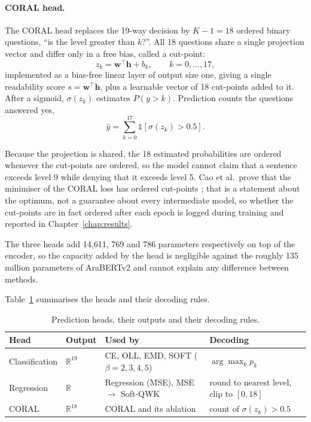 \paragraph{CORAL head.} The CORAL head \cite{cao2020coral} replaces the 19-way decision by
$K-1=18$ ordered binary questions, ``is the level greater than $k$?''. All 18 questions share a
single projection vector and differ only in a free bias, called a cut-point:
\begin{equation}
z_k = \mathbf{w}^{\top}\mathbf{h} + b_k, \qquad k = 0,\dots,17 ,
\label{eq:coral-logits}
\end{equation}
implemented as a bias-free linear layer of output size one, giving a single readability score
$s = \mathbf{w}^{\top}\mathbf{h}$, plus a learnable vector of 18 cut-points added to it. After
a sigmoid, $\sigma(z_k)$ estimates $P(y>k)$. Prediction counts the questions answered yes,
\begin{equation}
\hat{y} = \sum_{k=0}^{17} \mathbb{1}\left[\sigma(z_k) > 0.5\right].
\label{eq:coral-decode}
\end{equation}

Because the projection is shared, the 18 estimated probabilities are ordered whenever the
cut-points are ordered, so the model cannot claim that a sentence exceeds level 9 while denying
that it exceeds level 5. Cao et al.\ prove that the minimiser of the CORAL loss has ordered
cut-points \cite{cao2020coral}; that is a statement about the optimum, not a guarantee about
every intermediate model, so whether the cut-points are in fact ordered after each epoch is
logged during training and reported in Chapter~\ref{chap:results}.

The three heads add 14{,}611, 769 and 786 parameters respectively on top of the encoder, so the
capacity added by the head is negligible against the roughly 135 million parameters of AraBERTv2 and
cannot explain any difference between methods.

Table~\ref{tab:meth-heads} summarises the heads and their decoding rules.

\begin{table}[H]
\centering
\footnotesize
\caption{Prediction heads, their outputs and their decoding rules.}
\label{tab:meth-heads}
\begin{tabular}{p{2.6cm} p{1.9cm} p{4.3cm} p{4.0cm}}
\toprule
\textbf{Head} & \textbf{Output} & \textbf{Used by} & \textbf{Decoding} \\
\midrule
Classification & $\mathbb{R}^{19}$ & CE, OLL, EMD, SOFT ($\beta=2,3,4,5$) &
$\arg\max_k p_k$ \\
Regression & $\mathbb{R}$ & Regression (MSE), MSE $\rightarrow$ Soft-QWK &
round to nearest level, clip to $[0,18]$ \\
CORAL & $\mathbb{R}^{18}$ & CORAL and its ablation &
count of $\sigma(z_k) > 0.5$ \\
\bottomrule
\end{tabular}
\end{table}


